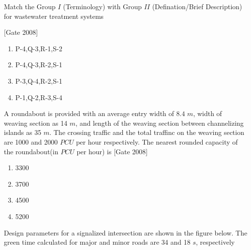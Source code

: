 	\item Match the Group $I$ (Terminology) with Group $II$ (Defination/Brief Description) for wastewater treatment systems   
		
		\hfill [Gate 2008]
\begin{multicols}{2}
	\begin{enumerate}
		\item P-4,Q-3,R-1,S-2
		\item P-4,Q-3,R-2,S-1
		\item P-3,Q-4,R-2,S-1
		\item P-1,Q-2,R-3,S-4
	\end{enumerate}
\end{multicols}


	\item A roundabout is provided with an average entry width of $8.4$ $m$, width of weaving section as 14 $m$, and length of the weaving section between channelizing islands as 35 $m$. The crossing traffic and the total traffinc on the weaving section are 1000 and 2000 $PCU$ per hour respectively. The nearest rounded capacity of the roundabout(in $PCU$ per hour) is  \hfill [Gate 2008]
\begin{multicols}{4}
	\begin{enumerate}
		\item 3300
		\item 3700
		\item 4500
		\item 5200
	\end{enumerate}
\end{multicols}	
	\item Design parameters for a signalized intersection are shown in the figure below. The green time calculated for major and minor roads are 34 and 18 $s$, respectively 
		

